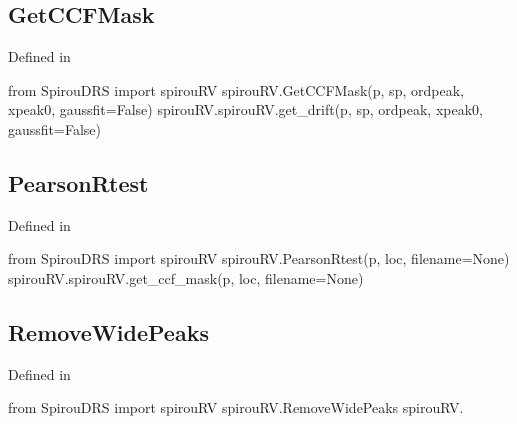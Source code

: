 \begin{minipage}{\textwidth}
\subsection{GetCCFMask}

Defined in \spirouRV{}

\begin{pythonbox}
from SpirouDRS import spirouRV
spirouRV.GetCCFMask(p, sp, ordpeak, xpeak0, gaussfit=False)
spirouRV.spirouRV.get_drift(p, sp, ordpeak, xpeak0, gaussfit=False)
\end{pythonbox}

\begin{pythondocstring}

\end{pythondocstring}
\end{minipage}

\begin{minipage}{\textwidth}
\subsection{PearsonRtest}

Defined in \spirouRV{}

\begin{pythonbox}
from SpirouDRS import spirouRV
spirouRV.PearsonRtest(p, loc, filename=None)
spirouRV.spirouRV.get_ccf_mask(p, loc, filename=None)
\end{pythonbox}

\begin{pythondocstring}

\end{pythondocstring}
\end{minipage}

\begin{minipage}{\textwidth}
\subsection{RemoveWidePeaks}

Defined in \spirouRV{}

\begin{pythonbox}
from SpirouDRS import spirouRV
spirouRV.RemoveWidePeaks
spirouRV.
\end{pythonbox}

\begin{pythondocstring}

\end{pythondocstring}
\end{minipage}

